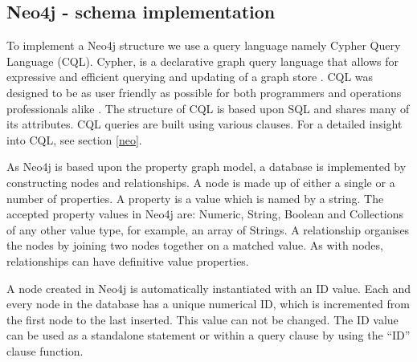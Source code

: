 \subsection{Neo4j - schema implementation}
To implement a Neo4j structure we use a query language namely Cypher Query Language (CQL). Cypher, is a declarative graph query language that allows for expressive and efficient querying and updating of a graph store \cite{nd}. CQL was designed to be as user friendly as possible for both programmers and operations professionals alike \cite{nd}. The structure of CQL is based upon SQL and shares many of its attributes. CQL queries are built using various clauses. For a detailed insight into CQL, see section \ref{neo}.

As Neo4j is based upon the property graph model, a database is implemented by constructing nodes and relationships. A node is made up of either a single or a number of properties. A property is a value which is named by a string. The accepted property values in Neo4j are: Numeric, String, Boolean and Collections of any other value type, for example, an array of Strings. A relationship organises the nodes by joining two nodes together on a matched value. As with nodes, relationships can have definitive value properties.

A node created in Neo4j is automatically instantiated with an ID value. Each and every node in the database has a unique numerical ID, which is incremented from the first node to the last inserted. This value can not be changed. The ID value can be used as a standalone statement or within a query clause by using the ``ID'' clause function.

